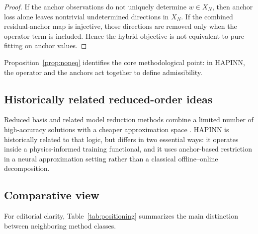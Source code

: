 \documentclass[preprint,12pt]{elsarticle}
\theoremstyle{definition}
\numberwithin{equation}{section}
\begin{document}
\begin{proof}
If the anchor observations do not uniquely determine $w\in X_N$, then anchor loss alone leaves nontrivial undetermined directions in $X_N$. If the combined residual-anchor map is injective, those directions are removed only when the operator term is included. Hence the hybrid objective is not equivalent to pure fitting on anchor values.
\end{proof}

Proposition~\ref{prop:noneq} identifies the core methodological point: in HAPINN, the operator and the anchors act together to define admissibility.

\subsection{Historically related reduced-order ideas}

Reduced basis and related model reduction methods combine a limited number of high-accuracy solutions with a cheaper approximation space \cite{ReducedBasis2008,ROMSurvey2015}. HAPINN is historically related to that logic, but differs in two essential ways: it operates inside a physics-informed training functional, and it uses anchor-based restriction in a neural approximation setting rather than a classical offline--online decomposition.

\subsection{Comparative view}

For editorial clarity, Table~\ref{tab:positioning} summarizes the main distinction between neighboring method classes.
\end{document}
